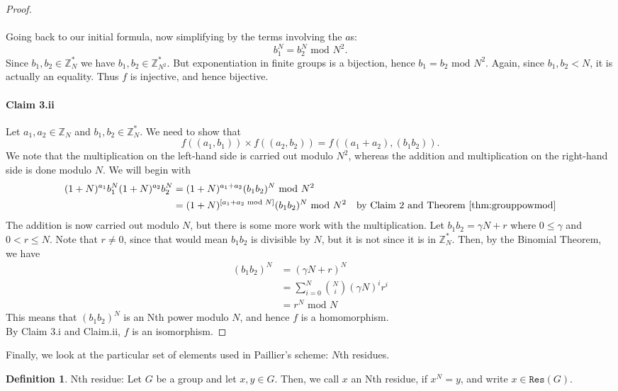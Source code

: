 \documentclass{article}
\theoremstyle{definition}
\newtheorem{definition}{Definition}[section]
\newcommand{\Int}{\mathbb{Z}}
\renewcommand{\mod}{\,\,\text{mod}\,\,}
\begin{document}
\begin{proof}
  \paragraph{} Going back to our initial formula, now simplifying by the terms
  involving the $a$s:
  \[
    b_1^N = b_2^N \mod N^2.
  \]
  Since $b_1, b_2 \in \Int_N^*$ we have $b_1, b_2\in \Int_{N^2}^*$. But
  exponentiation in finite groups is a bijection, hence $b_1 = b_2 \mod N^2$.
  Again, since $b_1, b_2 < N$, it is actually an equality. Thus $f$ is
  injective, and hence bijective.
  \paragraph{Claim 3.ii} Let $a_1, a_2 \in \Int_N$ and $b_1, b_2 \in \Int_N^*$. We need to show that
  \[
    f((a_1, b_1)) \times f((a_2, b_2)) = f((a_1 + a_2), (b_1b_2)).
  \]
  We note that the multiplication on the left-hand side is carried out modulo
  $N^2$, whereas the addition and multiplication on the right-hand side is done
  modulo $N$. We will begin with
  \begin{align*}
    (1 + N)^{a_1}b_1^N(1 + N)^{a_2}b_2^N &= (1 + N)^{a_1 + a_2}(b_1b_2)^N \mod N^2 \\
                                         &= (1 + N)^{[a_1 + a_2 \mod N]}(b_1b_2)^N \mod N^2 \quad \text{by Claim 2 and Theorem \ref{thm:grouppowmod}}
  \end{align*}
  The addition is now carried out modulo $N$, but there is some more work with
  the multiplication. Let $b_1b_2 = \gamma N + r$ where $0 \leq \gamma$ and $0 <
  r \leq N$. Note that $r \neq 0$, since that would mean $b_1b_2$ is divisible
  by $N$, but it is not since it is in $\Int_N^*$. Then, by the Binomial
  Theorem, we have
  \begin{align*}
    (b_1b_2)^N &= (\gamma N + r)^N \\
               &= \sum_{i = 0}^N \binom{N}{i}(\gamma N)^ir^i \\
               &= r^N \mod N
  \end{align*}
  This means that $(b_1b_2)^N$ is an Nth power modulo $N$, and hence $f$ is a
  homomorphism. \\
  By Claim 3.i and Claim.ii, $f$ is an isomorphism.
\end{proof}
Finally, we look at the particular set of elements used in Paillier's scheme:
$N$th residues.
\begin{definition}{Nth residue:} Let $G$ be a group and let $x, y \in G$. Then, we call $x$
  an Nth residue, if $x^N = y$, and write $x \in \texttt{Res}(G)$.
\end{definition}
\end{document}

